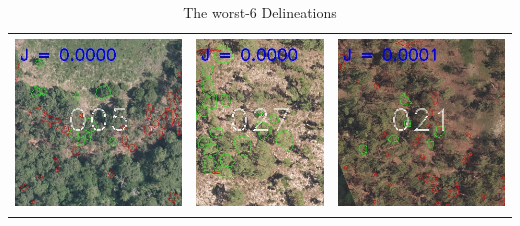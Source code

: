 \documentclass[]{report}   %
\begin{document}
\begin{table}
\label{tab:top3}
\caption{The worst-6 Delineations}
\center
\begin{tabular}{lll}
\\
\includegraphics[height=1.8in]{figure/bottom5_0.jpg} & \includegraphics[height=1.8in]{figure/bottom5_1.jpg} & \includegraphics[height=1.8in]{figure/bottom5_2.jpg} \\

\end{tabular}
\end{table}
\end{document}
